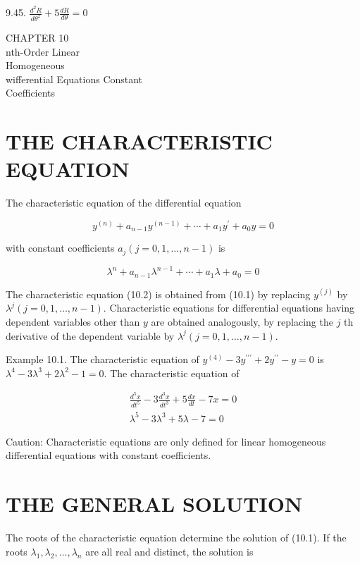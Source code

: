 \documentclass[10pt]{article}
\begin{document}
9.45. $\frac{d^{2} R}{d \theta^{2}}+5 \frac{d R}{d \theta}=0$

CHAPTER 10\\
nth-Order Linear\\
Homogeneous\\
wifferential Equations Constant\\
Coefficients

\section*{THE CHARACTERISTIC EQUATION}
The characteristic equation of the differential equation


\begin{equation*}
y^{(n)}+a_{n-1} y^{(n-1)}+\cdots+a_{1} y^{\prime}+a_{0} y=0 \tag{10.1}
\end{equation*}


with constant coefficients $a_{j}(j=0,1, \ldots, n-1)$ is


\begin{equation*}
\lambda^{n}+a_{n-1} \lambda^{n-1}+\cdots+a_{1} \lambda+a_{0}=0 \tag{10.2}
\end{equation*}


The characteristic equation (10.2) is obtained from (10.1) by replacing $y^{(j)}$ by $\lambda^{j}(j=0,1, \ldots, n-1)$. Characteristic equations for differential equations having dependent variables other than $y$ are obtained analogously, by replacing the $j$ th derivative of the dependent variable by $\lambda^{j}(j=0,1, \ldots, n-1)$.

Example 10.1. The characteristic equation of $y^{(4)}-3 y^{\prime \prime \prime}+2 y^{\prime \prime}-y=0$ is $\lambda^{4}-3 \lambda^{3}+2 \lambda^{2}-1=0$. The characteristic equation of

$$
\begin{gathered}
\frac{d^{5} x}{d t^{5}}-3 \frac{d^{3} x}{d t^{3}}+5 \frac{d x}{d t}-7 x=0 \\
\lambda^{5}-3 \lambda^{3}+5 \lambda-7=0
\end{gathered}
$$

Caution: Characteristic equations are only defined for linear homogeneous differential equations with constant coefficients.

\section*{THE GENERAL SOLUTION}
The roots of the characteristic equation determine the solution of (10.1). If the roots $\lambda_{1}, \lambda_{2}, \ldots, \lambda_{n}$ are all real and distinct, the solution is
\end{document}
